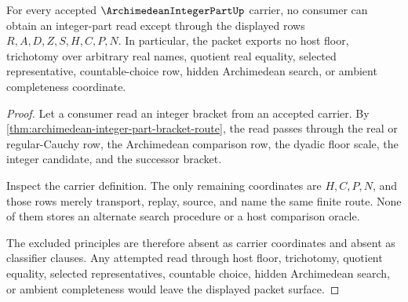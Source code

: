 \begin{theorem}
\label{thm:archimedean-integer-part-no-hidden-search}
For every accepted $\ArchimedeanIntegerPartUp$ carrier, no consumer can obtain an integer-part read except through the displayed rows $R,A,D,Z,S,H,C,P,N$. In particular, the packet exports no host floor, trichotomy over arbitrary real names, quotient real equality, selected representative, countable-choice row, hidden Archimedean search, or ambient completeness coordinate.
\end{theorem}
\begin{proof}
Let a consumer read an integer bracket from an accepted carrier. By \autoref{thm:archimedean-integer-part-bracket-route}, the read passes through the real or regular-Cauchy row, the Archimedean comparison row, the dyadic floor scale, the integer candidate, and the successor bracket.

Inspect the carrier definition. The only remaining coordinates are $H,C,P,N$, and those rows merely transport, replay, source, and name the same finite route. None of them stores an alternate search procedure or a host comparison oracle.

The excluded principles are therefore absent as carrier coordinates and absent as classifier clauses. Any attempted read through host floor, trichotomy, quotient equality, selected representatives, countable choice, hidden Archimedean search, or ambient completeness would leave the displayed packet surface.
\end{proof}




